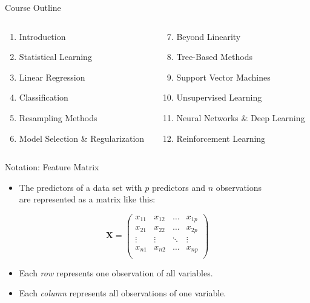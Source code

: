 \documentclass[mathserif, aspectratio=169]{beamer}
\begin{document}
\begin{frame}{Course Outline}
	\begin{columns}
		\begin{column}{0.5\textwidth}
			\begin{enumerate}
				\item Introduction
				\item Statistical Learning
				\item Linear Regression
				\item Classification
				\item Resampling Methods
				\item Model Selection \& Regularization
			\end{enumerate}
		\end{column}
		\begin{column}{0.5\textwidth}
			\begin{enumerate}
					\setcounter{enumi}{6}
				\item Beyond Linearity
				\item Tree-Based Methods
				\item Support Vector Machines
				\item Unsupervised Learning
				\item Neural Networks \& Deep Learning
				\item Reinforcement Learning
			\end{enumerate}
		\end{column}
	\end{columns}
\end{frame}

\begin{frame}{Notation: Feature Matrix}
	\begin{itemize}
		\item The predictors of a data set with $p$ predictors and $n$ observations\\
			are represented as a matrix like this:
	\end{itemize}
	\vspace{-8mm}
	\begin{center}
		\[ \bm{X} = 
			\begin{pmatrix}
				x_{11} & x_{12} & \dots & x_{1p} \\ 
				x_{21} & x_{22} & \dots & x_{2p} \\ 
				\vdots & \vdots & \ddots & \vdots \\
				x_{n1} & x_{n2} & \dots & x_{np} \\ 
			\end{pmatrix}
		\]
	\end{center}
	\begin{itemize}
		\item Each \emph{row} represents one observation of all variables.
		\item Each \emph{column} represents all observations of one variable.
	\end{itemize}
\end{frame}
\end{document}
